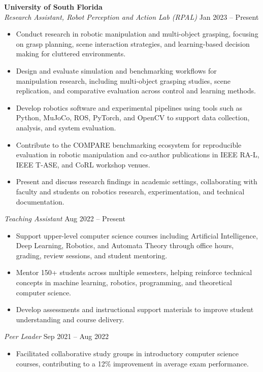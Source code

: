 \documentclass[a4paper,10pt]{article}
\begin{document}
\textbf{University of South Florida} \\

\emph{Research Assistant, Robot Perception and Action Lab (RPAL)} \hfill Jan 2023 -- Present
\begin{itemize}
    \item Conduct research in robotic manipulation and multi-object grasping, focusing on grasp planning, scene interaction strategies, and learning-based decision making for cluttered environments.
    \item Design and evaluate simulation and benchmarking workflows for manipulation research, including multi-object grasping studies, scene replication, and comparative evaluation across control and learning methods.
    \item Develop robotics software and experimental pipelines using tools such as Python, MuJoCo, ROS, PyTorch, and OpenCV to support data collection, analysis, and system evaluation.
    \item Contribute to the COMPARE benchmarking ecosystem for reproducible evaluation in robotic manipulation and co-author publications in IEEE RA-L, IEEE T-ASE, and CoRL workshop venues.
    \item Present and discuss research findings in academic settings, collaborating with faculty and students on robotics research, experimentation, and technical documentation.
\end{itemize}

\emph{Teaching Assistant} \hfill Aug 2022 -- Present
\begin{itemize}
    \item Support upper-level computer science courses including Artificial Intelligence, Deep Learning, Robotics, and Automata Theory through office hours, grading, review sessions, and student mentoring.
    \item Mentor 150+ students across multiple semesters, helping reinforce technical concepts in machine learning, robotics, programming, and theoretical computer science.
    \item Develop assessments and instructional support materials to improve student understanding and course delivery.
\end{itemize}

\emph{Peer Leader} \hfill Sep 2021 -- Aug 2022
\begin{itemize}
    \item Facilitated collaborative study groups in introductory computer science courses, contributing to a 12\% improvement in average exam performance.
\end{itemize}
\end{document}
